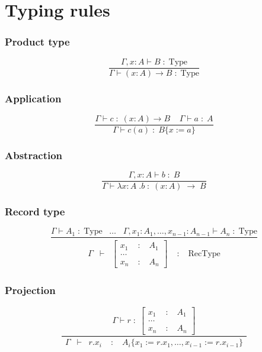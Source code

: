 

\section*{Typing rules}

\subsubsection*{Product type}
\[
\frac{
  \Gamma, x : A \vdash  B \;:\; \mbox{Type}
}{
  \Gamma \vdash  ( x:A )\rightarrow B \;:\; \mbox{Type}
}
\]

\subsubsection*{Application}
\[
\frac{
  \Gamma \vdash  c \;:\; ( x:A )\rightarrow B \;\;\;\;  \Gamma \vdash a \;:\; A
}{
  \Gamma \vdash  c(a) \;:\; B \{ x := a \}
}
\]

\subsubsection*{Abstraction}
\[
\frac{
  \Gamma, x : A \vdash   b \;:\; B
}{
  \Gamma \vdash  \lambda x:A\;.b\;:\;(x:A)\;\rightarrow\;B
}
\]

\subsubsection*{Record type}
\[
\frac{
    \Gamma \vdash A_{1} \;:\; \mbox{Type}  
     \;\;\;  \ldots \;\;\; 
    \Gamma, x_{1} : A_{1} , \ldots , x_{n-1} : A_{n-1}  \vdash A_{n} \;:\; \mbox{Type}
}{
  \begin{array}{lclcl}
  \Gamma & \vdash &\left[\begin{array}{lcl}x_{1} & \;:\; & A_{1} \\ \ldots & \\ x_{n} & \;:\; &  A_{n}\end{array}\right] 
    & \;:\; & \mbox{RecType}
  \end{array}
}
\]

\subsubsection*{Projection}
\[
\frac{
  \Gamma \vdash r \;:\; \left[\begin{array}{lcl}x_{1} & \;:\; & A_{1} \\ \ldots & \\ x_{n} & \;:\; &  A_{n}\end{array}\right]
}{
\begin{array}{lclcl}
  \Gamma & \vdash & r.x_{i} & \;:\; & A_{i} \{ x_{1} := r.x_{1} , \ldots , x_{i-1} := r.x_{i-1} \}
  \end{array}
}
\]

